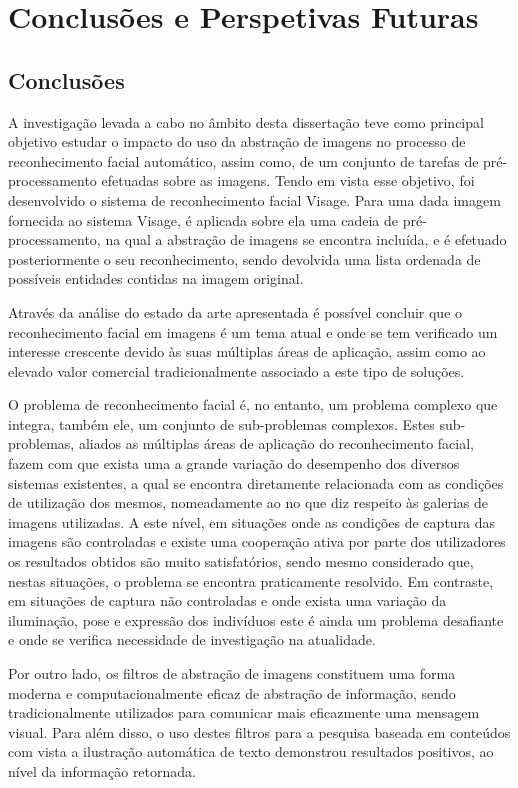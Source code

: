 \chapter{Conclusões e Perspetivas Futuras} \label{chap:conclusao}

\section{Conclusões}
A investigação levada a cabo no âmbito desta dissertação teve como principal objetivo estudar o impacto do uso da abstração de imagens no processo de reconhecimento facial automático, assim como, de um conjunto de tarefas de pré-processamento efetuadas sobre as imagens. Tendo em vista esse objetivo, foi desenvolvido o sistema de reconhecimento facial Visage. Para uma dada imagem fornecida ao sistema Visage, é aplicada sobre ela uma cadeia de pré-processamento, na qual a abstração de imagens se encontra incluída, e é efetuado posteriormente o seu reconhecimento, sendo devolvida uma lista ordenada de possíveis entidades contidas na imagem original.

Através da análise do estado da arte apresentada é possível concluir que o reconhecimento facial em imagens é um tema atual e onde se tem verificado um interesse crescente devido às suas múltiplas áreas de aplicação, assim como ao elevado valor comercial tradicionalmente associado a este tipo de soluções. 

O problema de reconhecimento facial é, no entanto, um problema complexo que integra, também ele, um conjunto de sub-problemas  complexos. Estes sub-problemas, aliados as múltiplas áreas de aplicação do reconhecimento facial, fazem com que exista uma a grande variação do desempenho dos diversos sistemas existentes, a qual se encontra diretamente relacionada com as condições de utilização dos mesmos, nomeadamente ao no que diz respeito às galerias de imagens utilizadas. A este nível, em situações onde as condições de captura das imagens são controladas e existe uma cooperação ativa por parte dos utilizadores os resultados obtidos são muito satisfatórios, sendo mesmo considerado que, nestas situações, o problema se encontra praticamente resolvido. Em contraste, em situações de captura não controladas e onde exista uma variação da iluminação, pose e expressão dos indivíduos este é ainda um problema desafiante e onde se verifica necessidade de investigação na atualidade.

Por outro lado, os filtros de abstração de imagens constituem uma forma moderna e computacionalmente eficaz de abstração de informação, sendo tradicionalmente utilizados para comunicar mais eficazmente uma mensagem visual. Para além disso, o uso destes filtros para a pesquisa baseada em conteúdos com vista a ilustração automática de texto demonstrou resultados positivos, ao nível da informação retornada.

